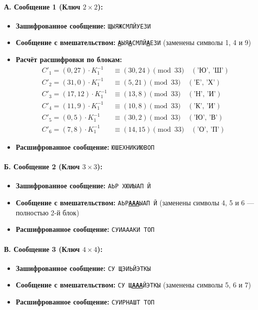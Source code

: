 \paragraph{А. Сообщение 1 (Ключ $2\times2$):}
\begin{itemize}
    \item \textbf{Зашифрованное сообщение:} \texttt{ЩЫЯЖСМЛЙУЕЗИ}
    \item \textbf{Сообщение с вмешательством:} \texttt{\textbf{\underline{А}}ЫЯ\textbf{\underline{А}}СМЛЙ\textbf{\underline{А}}ЕЗИ} (заменены символы 1, 4 и 9)
    \item \textbf{Расчёт расшифровки по блокам:}
    \[
    \begin{aligned}
        C'_1 = (0, 27) \cdot K_1^{-1} &\equiv (30, 24) \pmod{33} \quad (\text{'Ю', 'Ш'}) \\
        C'_2 = (31, 0) \cdot K_1^{-1} &\equiv (5, 21) \pmod{33} \quad (\text{'Е', 'Х'}) \\
        C'_3 = (17, 12) \cdot K_1^{-1} &\equiv (13, 8) \pmod{33} \quad (\text{'Н', 'И'}) \\
        C'_4 = (11, 9) \cdot K_1^{-1} &\equiv (10, 8) \pmod{33} \quad (\text{'К', 'И'}) \\
        C'_5 = (0, 5) \cdot K_1^{-1} &\equiv (30, 2) \pmod{33} \quad (\text{'Ю', 'В'}) \\
        C'_6 = (7, 8) \cdot K_1^{-1} &\equiv (14, 15) \pmod{33} \quad (\text{'О', 'П'})
    \end{aligned}
    \]
    \item \textbf{Расшифрованное сообщение:} \texttt{ЮШЕХНИКИЮВОП}
\end{itemize}

\paragraph{Б. Сообщение 2 (Ключ $3\times3$):}
\begin{itemize}
    \item \textbf{Зашифрованное сообщение:} \texttt{АЬР ХЮИЫАП Й}
    \item \textbf{Сообщение с вмешательством:} \texttt{АЬР\textbf{\underline{ААА}}ЫАП Й} (заменены символы 4, 5 и 6 — полностью 2-й блок)
    \item \textbf{Расшифрованное сообщение:} \texttt{СУИАААКИ ТОП}
\end{itemize}

\paragraph{В. Сообщение 3 (Ключ $4\times4$):}
\begin{itemize}
    \item \textbf{Зашифрованное сообщение:} \texttt{СУ ЩЭИЬЙЭТКЫ}
    \item \textbf{Сообщение с вмешательством:} \texttt{СУ Щ\textbf{\underline{ААА}}ЙЭТКЫ} (заменены символы 5, 6 и 7)
    \item \textbf{Расшифрованное сообщение:} \texttt{СУИРНАШТ ТОП}
\end{itemize}

